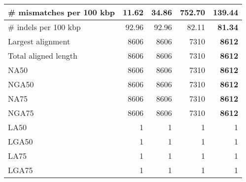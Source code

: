 \documentclass[12pt,a4paper]{article}
\begin{document}
\begin{table}[ht]
\begin{center}
\begin{tabular}{|l*{4}{|r}|}
\# mismatches per 100 kbp & {\bf 11.62} & 34.86 & 752.70 & 139.44 \\ \hline
\# indels per 100 kbp & 92.96 & 92.96 & 82.11 & {\bf 81.34} \\ \hline
Largest alignment & 8606 & 8606 & 7310 & {\bf 8612} \\ \hline
Total aligned length & 8606 & 8606 & 7310 & {\bf 8612} \\ \hline
NA50 & 8606 & 8606 & 7310 & {\bf 8612} \\ \hline
NGA50 & 8606 & 8606 & 7310 & {\bf 8612} \\ \hline
NA75 & 8606 & 8606 & 7310 & {\bf 8612} \\ \hline
NGA75 & 8606 & 8606 & 7310 & {\bf 8612} \\ \hline
LA50 & 1 & 1 & 1 & 1 \\ \hline
LGA50 & 1 & 1 & 1 & 1 \\ \hline
LA75 & 1 & 1 & 1 & 1 \\ \hline
LGA75 & 1 & 1 & 1 & 1 \\ \hline
\end{tabular}
\end{center}
\end{table}
\end{document}
